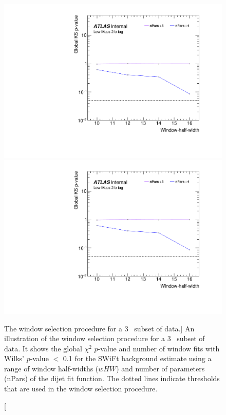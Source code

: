 \begin{figure}[!htb]
\captionsetup[subfigure]{aboveskip=0pt,justification=centering}
\centering
{} {
  \includegraphics[width=0.45\linewidth, angle=0,page=2]{figs/Dibjet/LowMass/FitStudy_min566/windowSel_subset.pdf}
}\hspace{-8mm}
 {
  \includegraphics[width=0.45\linewidth, angle=0,page=4]{figs/Dibjet/LowMass/FitStudy_min566/windowSel_subset.pdf}
}

\vspace{-0.5em}
\caption
    [The window selection procedure for a 3~\ifb{} subset of \lm{} data.]
    {\label{fig:windowSel_subset}
      An illustration of the window selection procedure for a 3~\ifb{} subset of \lm{} data.
      It shows the global $\chi^{2}$ \mbox{$p$-value}
      and number of window fits with Wilks' \mbox{$p$-value} $<$ 0.1 for the SWiFt background estimate
      using a range of window half-widths ($wHW$) and number of parameters (nPars) of the dijet fit function.
      The dotted lines indicate thresholds that are used in the window selection procedure.
    }
\vspace{-1em}
\end{figure}


